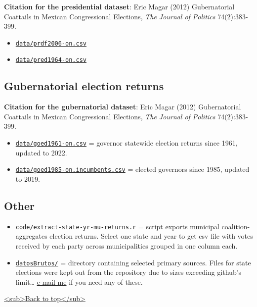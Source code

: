 \documentclass[11pt]{article}
\begin{document}
\textbf{Citation for the presidential dataset}: Eric Magar (2012) Gubernatorial Coattails in Mexican Congressional Elections, \emph{The Journal of Politics} 74(2):383-399.
\begin{itemize}
\item \href{./data/prdf2006-on.csv}{\texttt{data/prdf2006-on.csv}}
\item \href{./data/pred1964-on.csv}{\texttt{data/pred1964-on.csv}}
\end{itemize}
\subsection{Gubernatorial election returns}
\label{sec:org226487f}
\textbf{Citation for the gubernatorial dataset}: Eric Magar (2012) Gubernatorial Coattails in Mexican Congressional Elections, \emph{The Journal of Politics} 74(2):383-399.
\begin{itemize}
\item \href{./data/goed1961-on.csv}{\texttt{data/goed1961-on.csv}} = governor statewide election returns since 1961, updated to 2022.
\item \href{./data/goed1985-on.incumbents.csv}{\texttt{data/goed1985-on.incumbents.csv}} = elected governors since 1985, updated to 2019.
\end{itemize}
\subsection{Other}
\label{sec:org108b619}
\begin{itemize}
\item \href{./code/extract-state-yr-mu-returns.r}{\texttt{code/extract-state-yr-mu-returns.r}} = script exports municipal coalition-aggregates election returns. Select one state and year to get csv file with votes received by each party across municipalities grouped in one column each.
\item \href{./datosBrutos/}{\texttt{datosBrutos/}} = directory containing selected primary sources. Files for state elections were kept out from the repository due to sizes exceeding github's limit\ldots{} \href{mailto:emagar@itam.mx}{e-mail me} if you need any of these.
\end{itemize}
\hyperref[org5520298]{<sub>Back to top</sub>}
\end{document}
